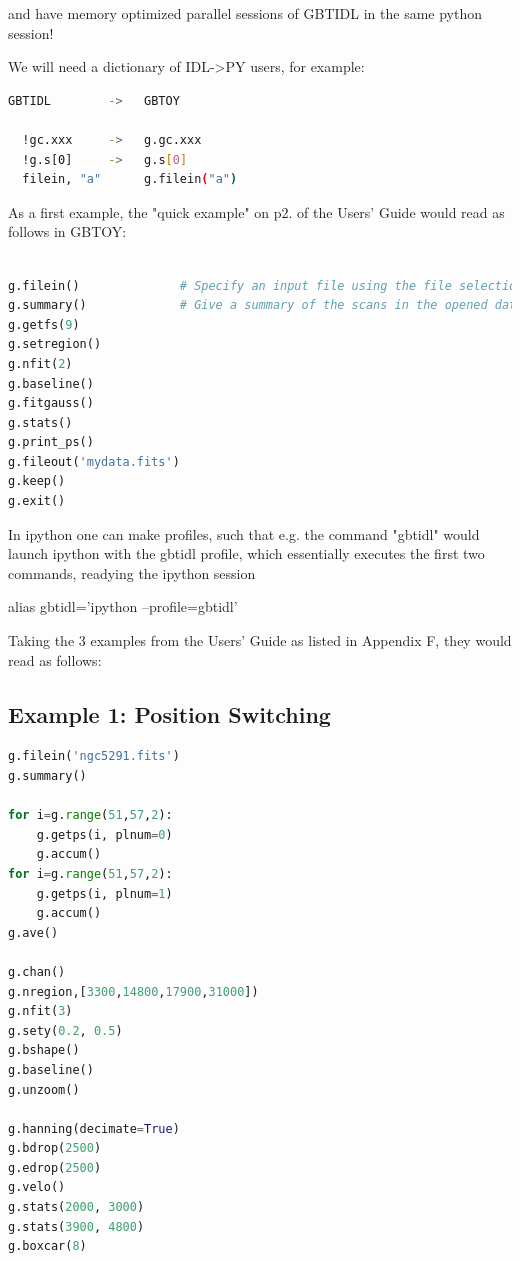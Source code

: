 \documentclass[12pt,a4paper]{article}
\begin{document}
and have memory optimized parallel sessions of GBTIDL in the same
python session!

We will need a dictionary of IDL->PY users, for example:

\begin{lstlisting}[language=bash]
GBTIDL        ->   GBTOY

  !gc.xxx     ->   g.gc.xxx
  !g.s[0]     ->   g.s[0]
  filein, "a"      g.filein("a")
\end{lstlisting}

As a first example, the "quick example" on p2. of the Users' Guide would
read as follows in GBTOY:

\begin{lstlisting}[language=python]
% gbtidl                # start up an ipython session with the gbtidl profile

g.filein()              # Specify an input file using the file selection GUI
g.summary()             # Give a summary of the scans in the opened data file
g.getfs(9)
g.setregion()
g.nfit(2)
g.baseline()
g.fitgauss()
g.stats()
g.print_ps()
g.fileout('mydata.fits')
g.keep()
g.exit()

\end{lstlisting}


In ipython one can make profiles, such that e.g. the command "gbtidl" would launch ipython with
the gbtidl profile, which essentially executes the first two commands, readying the ipython
session 

    alias gbtidl='ipython --profile=gbtidl'

Taking the 3 examples from the Users' Guide as listed in Appendix F,
they would read as follows:

\subsection{Example 1:   Position Switching}

\begin{lstlisting}[language=python]
g.filein('ngc5291.fits')
g.summary()

for i=g.range(51,57,2):
    g.getps(i, plnum=0)
    g.accum()
for i=g.range(51,57,2):
    g.getps(i, plnum=1)
    g.accum()
g.ave()

g.chan()
g.nregion,[3300,14800,17900,31000])
g.nfit(3)
g.sety(0.2, 0.5)
g.bshape()
g.baseline()
g.unzoom()

g.hanning(decimate=True)
g.bdrop(2500)
g.edrop(2500)
g.velo()
g.stats(2000, 3000)
g.stats(3900, 4800)
g.boxcar(8)
\end{lstlisting}
\end{document}
